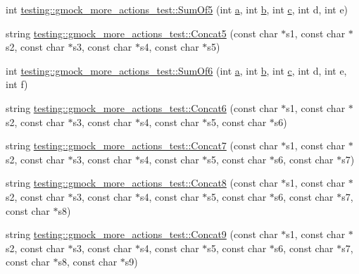 \begin{DoxyCompactItemize}
\item 
int \hyperlink{namespacetesting_1_1gmock__more__actions__test_a38e64569bf08e83c6db22c1fb0fe0af6}{testing\+::gmock\+\_\+more\+\_\+actions\+\_\+test\+::\+Sum\+Of5} (int \hyperlink{_07copy_08_2_read_camera_model_8m_a551a3d351eadcc0b9b1a2f24f0fb5ea0}{a}, int \hyperlink{jquery_8js_a2fa551895933fae935a0a6b87282241d}{b}, int \hyperlink{jquery_8js_abce695e0af988ece0826d9ad59b8160d}{c}, int d, int e)
\item 
string \hyperlink{namespacetesting_1_1gmock__more__actions__test_a2ac9917d1aa19cd7ac32bba837f4eacc}{testing\+::gmock\+\_\+more\+\_\+actions\+\_\+test\+::\+Concat5} (const char $\ast$s1, const char $\ast$s2, const char $\ast$s3, const char $\ast$s4, const char $\ast$s5)
\item 
int \hyperlink{namespacetesting_1_1gmock__more__actions__test_a139632d344348fdfa25111d4e43f70ba}{testing\+::gmock\+\_\+more\+\_\+actions\+\_\+test\+::\+Sum\+Of6} (int \hyperlink{_07copy_08_2_read_camera_model_8m_a551a3d351eadcc0b9b1a2f24f0fb5ea0}{a}, int \hyperlink{jquery_8js_a2fa551895933fae935a0a6b87282241d}{b}, int \hyperlink{jquery_8js_abce695e0af988ece0826d9ad59b8160d}{c}, int d, int e, int f)
\item 
string \hyperlink{namespacetesting_1_1gmock__more__actions__test_a4de188277a85d007de0aa6e8dc364b75}{testing\+::gmock\+\_\+more\+\_\+actions\+\_\+test\+::\+Concat6} (const char $\ast$s1, const char $\ast$s2, const char $\ast$s3, const char $\ast$s4, const char $\ast$s5, const char $\ast$s6)
\item 
string \hyperlink{namespacetesting_1_1gmock__more__actions__test_a5628f71ebb5ae61a6e56396145a76da4}{testing\+::gmock\+\_\+more\+\_\+actions\+\_\+test\+::\+Concat7} (const char $\ast$s1, const char $\ast$s2, const char $\ast$s3, const char $\ast$s4, const char $\ast$s5, const char $\ast$s6, const char $\ast$s7)
\item 
string \hyperlink{namespacetesting_1_1gmock__more__actions__test_a122e4affe78745eef3dd748e88bd248c}{testing\+::gmock\+\_\+more\+\_\+actions\+\_\+test\+::\+Concat8} (const char $\ast$s1, const char $\ast$s2, const char $\ast$s3, const char $\ast$s4, const char $\ast$s5, const char $\ast$s6, const char $\ast$s7, const char $\ast$s8)
\item 
string \hyperlink{namespacetesting_1_1gmock__more__actions__test_a9f8c8c01bc080a04d798060dad757cf9}{testing\+::gmock\+\_\+more\+\_\+actions\+\_\+test\+::\+Concat9} (const char $\ast$s1, const char $\ast$s2, const char $\ast$s3, const char $\ast$s4, const char $\ast$s5, const char $\ast$s6, const char $\ast$s7, const char $\ast$s8, const char $\ast$s9)

\end{DoxyCompactItemize}
